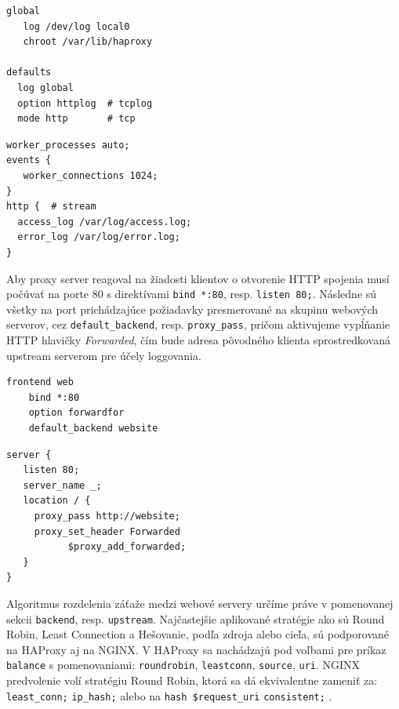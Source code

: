 \documentclass[12pt, a4paper]{article}
\begin{document}
\noindent\begin{minipage}{.48\textwidth}
\begin{lstlisting}[caption=HAProxy mód prevádzky a logging]
global
   log /dev/log local0
   chroot /var/lib/haproxy

defaults
  log global
  option httplog  # tcplog
  mode http       # tcp
\end{lstlisting}
\end{minipage}\hfill
\begin{minipage}{.48\textwidth}
\begin{lstlisting}[caption=NGINX mód prevádzky a logging]
worker_processes auto;
events {
   worker_connections 1024;
}
http {  # stream
  access_log /var/log/access.log;
  error_log /var/log/error.log;
}
\end{lstlisting}
\end{minipage}

Aby proxy server reagoval na žiadosti klientov o otvorenie HTTP spojenia musí počúvať na porte 80 
s direktívami \verb|bind *:80|, resp. \verb|listen 80;|. Následne sú všetky na port prichádzajúce 
požiadavky presmerované na skupinu webových serverov, cez \verb|default_backend|, resp. \verb|proxy_pass|, 
pričom aktivujeme vypĺňanie HTTP hlavičky \emph{Forwarded}, čím bude adresa pôvodného klienta 
sprostredkovaná upstream serverom pre účely loggovania.

\noindent\begin{minipage}{.48\textwidth}
\begin{lstlisting}[caption=HAProxy: preposielanie požiadavok na pool serverov za reverznou proxy]
frontend web
    bind *:80
    option forwardfor
    default_backend website
\end{lstlisting}
\end{minipage}\hfill
\begin{minipage}{.48\textwidth}
\begin{lstlisting}[caption=NGINX: preposielanie požiadavok na pool serverov za reverznou proxy]
server {
   listen 80;
   server_name _;
   location / { 
     proxy_pass http://website;
     proxy_set_header Forwarded 
           $proxy_add_forwarded;
   }
}
\end{lstlisting}
\end{minipage}

Algoritmus rozdelenia záťaže medzi webové servery určíme práve v pomenovanej sekcii \verb|backend|, resp.
\verb|upstream|. Najčastejšie aplikované stratégie ako sú Round Robin, Least Connection a Hešovanie, podľa 
zdroja alebo cieľa, sú podporované na HAProxy aj na NGINX. V HAProxy sa nachádzajú pod voľbami pre príkaz 
\verb|balance| s pomenovaniami: \verb|roundrobin|, \verb|leastconn|, \verb|source|, \verb|uri|.
\cite{haproxy-docs} NGINX predvolenie volí stratégiu Round Robin, ktorá sa dá ekvivalentne zameniť za: 
\verb|least_conn;| \verb|ip_hash;| alebo na \verb|hash $request_uri| \verb|consistent;| 
\cite{nginx-http-balancer}.
\end{document}
